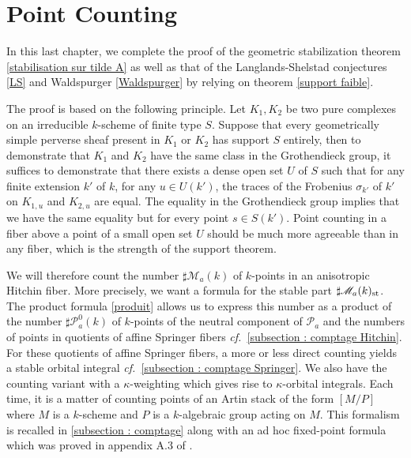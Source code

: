 \documentclass[12pt,english]{smfart}
\numberwithin{equation}{subsection}
\theoremstyle{remark}
\newcommand\calP{{\mathscr P}}
\newcommand\calM{{\mathscr M}}
\newcommand\cf{{\it cf.\ }}
\begin{document}
\section{Point Counting}
\label{section : comptage}

In this last chapter, we complete the proof of the geometric stabilization theorem \ref{stabilisation sur tilde A} as well as that of the Langlands-Shelstad conjectures \ref{LS} and Waldspurger \ref{Waldspurger} by relying on theorem \ref{support faible}.

The proof is based on the following principle. Let $K_1,K_2$ be two pure complexes on an irreducible $k$-scheme of finite type $S$. Suppose that every geometrically simple perverse sheaf present in $K_1$ or $K_2$ has support $S$ entirely, then to demonstrate that $K_1$ and $K_2$ have the same class in the Grothendieck group, it suffices to demonstrate that there exists a dense open set $U$ of $S$ such that for any finite extension $k'$ of $k$, for any $u\in U(k')$, the traces of the Frobenius $\sigma_{k'}$ of $k'$ on $K_{1,u}$ and $K_{2,u}$ are equal. The equality in the Grothendieck group implies that we have the same equality but for every point $s\in S(k')$. Point counting in a fiber above a point of a small open set $U$ should be much more agreeable than in any fiber, which is the strength of the support theorem.

We will therefore count the number $\sharp \calM_a(k)$ of $k$-points in an anisotropic Hitchin fiber.
More precisely, we want a formula for the stable part $\sharp \calM_a(k)_{\rm st}$.
The product formula \ref{produit} allows us to express this number as a product of the number $\sharp\calP_a^0(k)$ of $k$-points of the neutral component of $\calP_a$ and the numbers of points in quotients of affine Springer fibers \cf \ref{subsection : comptage Hitchin}. For these quotients of affine Springer fibers, a more or less direct counting yields a stable orbital integral \cf \ref{subsection : comptage Springer}. We also have the counting variant with a $\kappa$-weighting which gives rise to $\kappa$-orbital integrals. Each time, it is a matter of counting points of an Artin stack of the form $[M/P]$ where $M$ is a $k$-scheme and $P$ is a $k$-algebraic group acting on $M$. This formalism is recalled in \ref{subsection : comptage} along with an ad hoc fixed-point formula which was proved in appendix A.3 of \cite{LN}.
\end{document}
